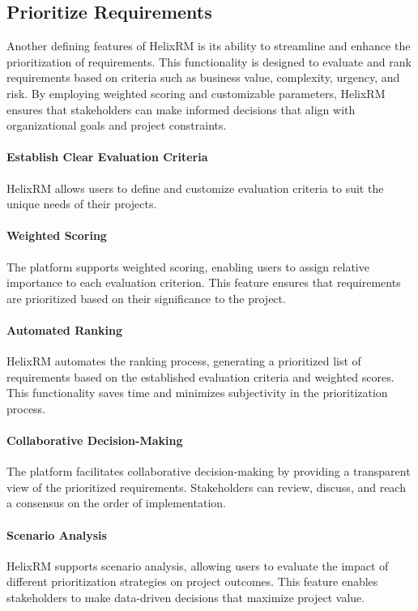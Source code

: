 \subsection{Prioritize Requirements}\label{subsec:prioritize-requirements}

Another defining features of HelixRM is its ability to streamline and enhance the prioritization of requirements.
This functionality is designed to evaluate and rank requirements based on criteria such as business value, complexity, urgency, and risk.
By employing weighted scoring and customizable parameters, HelixRM ensures that stakeholders can make informed decisions that align with organizational goals and project constraints.

\paragraph{Establish Clear Evaluation Criteria}
HelixRM allows users to define and customize evaluation criteria to suit the unique needs of their projects.

\paragraph{Weighted Scoring}
The platform supports weighted scoring, enabling users to assign relative importance to each evaluation criterion.
This feature ensures that requirements are prioritized based on their significance to the project.

\paragraph{Automated Ranking}
HelixRM automates the ranking process, generating a prioritized list of requirements based on the established evaluation criteria and weighted scores.
This functionality saves time and minimizes subjectivity in the prioritization process.

\paragraph{Collaborative Decision-Making}
The platform facilitates collaborative decision-making by providing a transparent view of the prioritized requirements.
Stakeholders can review, discuss, and reach a consensus on the order of implementation.

\paragraph{Scenario Analysis}
HelixRM supports scenario analysis, allowing users to evaluate the impact of different prioritization strategies on project outcomes.
This feature enables stakeholders to make data-driven decisions that maximize project value.

